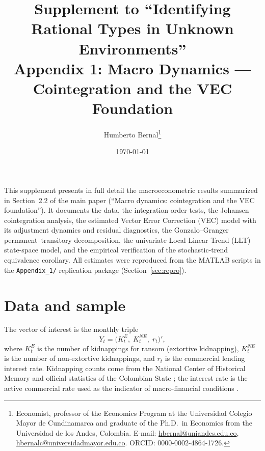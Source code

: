 \documentclass[12pt]{article}
\numberwithin{equation}{section}
\numberwithin{table}{section}
\theoremstyle{definition}
\newcommand{\KE}{K^{E}}
\newcommand{\KNE}{K^{NE}}
\begin{document}
\title{Supplement to ``Identifying Rational Types in Unknown Environments''\\
Appendix 1: Macro Dynamics --- Cointegration and the VEC Foundation}
\author{Humberto Bernal\thanks{Economist, professor of the Economics Program at the Universidad Colegio Mayor de Cundinamarca and graduate of the Ph.D.\ in Economics from the Universidad de los Andes, Colombia. E-mail: \href{mailto:hbernal@uniandes.edu.co}{hbernal@uniandes.edu.co}, \href{mailto:hbernalc@universidadmayor.edu.co}{hbernalc@universidadmayor.edu.co}. ORCID: 0000-0002-4864-1726.}}
\date{\today}
\maketitle

\newpage

\noindent
This supplement presents in full detail the macroeconometric results
summarized in Section~2.2 of the main paper (``Macro dynamics: cointegration
and the VEC foundation''). It documents the data, the
integration-order tests, the Johansen cointegration analysis, the estimated
Vector Error Correction (VEC) model with its adjustment dynamics and residual
diagnostics, the Gonzalo--Granger permanent--transitory decomposition, the
univariate Local Linear Trend (LLT) state-space model, and the empirical
verification of the stochastic-trend equivalence corollary. All estimates
were reproduced from the MATLAB scripts in the \texttt{Appendix\_1/}
replication package (Section~\ref{sec:repro}).

\section{Data and sample}
\label{sec:data}

The vector of interest is the monthly triple
\begin{equation}
Y_t = \bigl(\KE_t,\; \KNE_t,\; r_t\bigr)',
\label{eq:vector}
\end{equation}
where $\KE_t$ is the number of kidnappings for ransom (extortive kidnapping),
$\KNE_t$ is the number of non-extortive kidnappings, and $r_t$ is the
commercial lending interest rate. Kidnapping counts come from the National
Center of Historical Memory \citep{CNMH2013,cnmh_datos} and official
statistics of the Colombian State \citep{mindefensa_stats}; the interest rate
is the active commercial rate used as the indicator of macro-financial
conditions \citep{Masih1995,Suarez_2025}.
\end{document}
